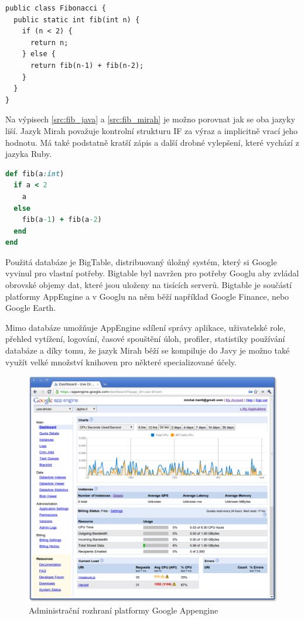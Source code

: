 \documentclass[bc,female,java,dept456]{diploma}						%
\begin{document}
\begin{lstlisting}[label=src:fib_java,caption=Fibonacciho posloupnost v Javě]
public class Fibonacci {
  public static int fib(int n) {
    if (n < 2) {
      return n;
    } else {
      return fib(n-1) + fib(n-2);
    }
  }
}
\end{lstlisting}

Na výpisech \ref{src:fib_java} a \ref{src:fib_mirah} je možno porovnat jak se oba jazyky liší. Jazyk Mirah považuje kontrolní strukturu IF za výraz a implicitně vrací jeho hodnotu. Má také podstatně kratší zápis a další drobné vylepšení, které vychází z jazyka Ruby.

\begin{lstlisting}[label=src:fib_mirah,caption=Fibonacciho posloupnost v Mirah,language=Ruby]
def fib(a:int) 
  if a < 2 
    a 
  else 
    fib(a-1) + fib(a-2) 
  end 
end 
\end{lstlisting}

Použitá databáze je BigTable, distribuovaný úložný systém, který si Google vyvinul pro vlastní potřeby. Bigtable byl navržen pro potřeby Googlu aby zvládal obrovské objemy dat, které jsou uloženy na tisících serverů. Bigtable je součástí platformy AppEngine a v Googlu na něm běží například Google Finance, nebo Google Earth.

Mimo databáze umožňuje AppEngine sdílení správy aplikace, uživatelské role, přehled vytížení, logování, časové spouštění úloh, profiler, statistiky používání databáze a díky tomu, že jazyk Mirah běží se kompiluje do Javy je možno také využít velké množství knihoven pro některé specializované účely.


\begin{figure}[h]
	\centering
	\includegraphics[width=15cm]{img/appspot_window.pdf}
	\caption{Administrační rozhraní platformy Google Appengine}
	\label{analog_daily}
\end{figure}
\end{document}
